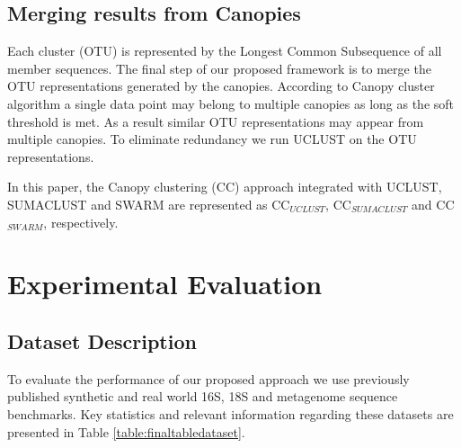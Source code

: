 \documentclass[10pt, conference, compsocconf]{IEEEtran}
\begin{document}
\subsection{\textbf{Merging results from Canopies}}

Each cluster (OTU) is represented by the Longest Common Subsequence of all member sequences. The final step of 
our proposed framework is to merge the 
OTU representations generated by the 
canopies. According to Canopy cluster algorithm a single data point may belong to multiple canopies as long as the soft threshold is met. As a result similar OTU representations may appear from multiple canopies. To eliminate redundancy we run UCLUST on the OTU representations.

In this paper,  the Canopy clustering (CC)  approach 
integrated with UCLUST, SUMACLUST and SWARM 
are represented as CC$_{UCLUST}$, CC$_{SUMACLUST}$ and CC$_{SWARM}$, respectively. %

\section{Experimental Evaluation}
\label{sec:Experimental}

\subsection{\textbf{Dataset Description}}

To evaluate the performance of our proposed approach we use previously 
published synthetic and real world 16S, 18S and metagenome sequence benchmarks. Key statistics and relevant 
information regarding these datasets are presented in Table \ref{table:finaltabledataset}. 
\end{document}
